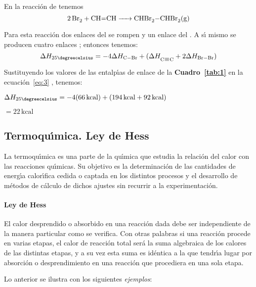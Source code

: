 \begin{example}
En la reacci\'on de  
tenemos
\begin{equation}
\ce{2Br2 + CH=CH ->  CHBr2-CHBr2(g)}
\end{equation}

Para esta reacci\'on dos enlaces  del  se rompen y un enlace  del . A s\'{\i} mismo se producen cuatro enlaces ; entonces tenemos:
\begin{equation}
\label{eq:3}
\Delta H_{25\degreecelsius} = - 4\Delta H_{\ce{C-Br}} 
+ (\Delta H_{\ce{C\bond{#}C} } + 2\Delta H_{\ce{Br-Br}})
\end{equation}
Sustituyendo los valores de las entalp\'{\i}as de enlace de la \textbf{Cuadro~\ref{tab:1}} en la e\-cua\-ci\'on~\ref{eq:3} , tenemos:

\hskip 1in   $\Delta H_{25\degreecelsius} = -4(66 \,\textrm{kcal}) + (194 \,\textrm{kcal} + 92 \,\textrm{kcal})$

\hskip 1.59in $= 22 \,\textrm{kcal}$
\end{example}

\subsection{Termoqu\'{\i}mica. Ley de Hess}

La termoqu\'{\i}mica es una parte de la qu\'{\i}mica que estudia la relaci\'on del calor con las reacciones qu\'{\i}micas. Su objetivo es
la determinaci\'on de las cantidades de energ\'{\i}a calor\'{\i}fica cedida o captada en los distintos procesos y el desarrollo de
m\'etodos de c\'alculo de dichos ajustes sin recurrir a la experimentaci\'on.

\paragraph{Ley de Hess} El calor desprendido o absorbido en una reacci\'on dada debe ser independiente de la manera particular como se verifica. Con otras palabras si una reacci\'on procede en varias etapas, el calor de reacci\'on total ser\'a la suma algebraica de los calores de las distintas etapas, y a su vez esta suma es id\'entica a la que tendr\'{\i}a lugar por absorci\'on o desprendimiento en una reacci\'on que procediera en una sola etapa.

Lo anterior se ilustra con los siguientes \textit{ejemplos}:

